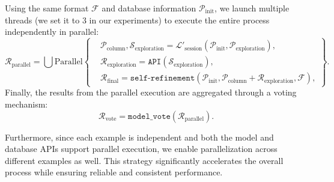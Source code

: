     Using the same format $\mathcal{F}$ and database information $\mathcal{P}_{\text{init}}$, we  launch multiple threads (we set it to 3 in our experiments) to execute the entire process independently in parallel:
    \begin{equation}
        \mathcal{R}_{\text{parallel}} = \bigcup \text{Parallel}\left\{
        \begin{aligned}
            &\mathcal{P}_{\text{column}}, \mathcal{S}_{\text{exploration}} = \mathcal{L}'_{\text{session}}(\mathcal{P}_{\text{init}}, \mathcal{P}_{\text{exploration}}), \\
            &\mathcal{R}_{\text{exploration}} = \texttt{API}(\mathcal{S}_{\text{exploration}}), \\
            &\mathcal{R}_{\text{final}} = \texttt{self-refinement}(\mathcal{P}_{\text{init}}, \mathcal{P}_{\text{column}} + \mathcal{R}_{\text{exploration}}, \mathcal{F}),
        \end{aligned}
        \right\}.
    \end{equation}
    Finally, the results from the parallel execution are aggregated through a voting mechanism:
    \begin{equation}
        \mathcal{R}_{\text{vote}} = \texttt{model\_vote}(\mathcal{R}_{\text{parallel}}).
    \end{equation}
     
    Furthermore, since each example is independent and both the model and database APIs support parallel execution, we enable parallelization across different examples as well. This strategy significantly accelerates the overall process while ensuring reliable and consistent performance.